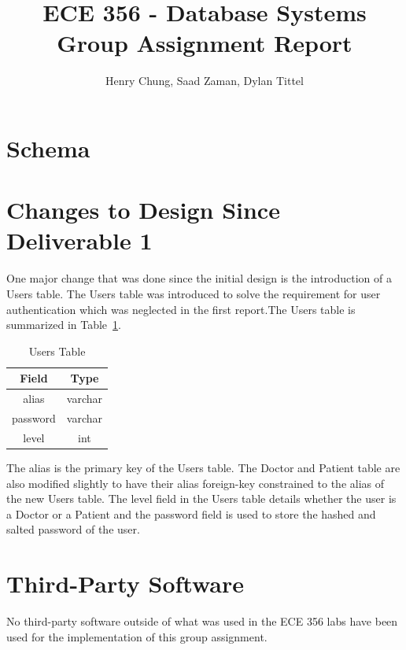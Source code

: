 \documentclass{article}
\begin{document}
\title{ECE 356 - Database Systems Group Assignment Report}
\author{Henry Chung, Saad Zaman, Dylan Tittel}

\maketitle

\tableofcontents
\newpage

\section{Schema}

\section{Changes to Design Since Deliverable 1}
One major change that was done since the initial design is the introduction of a Users table. The Users table was introduced to solve the requirement for user authentication which was neglected in the first report.The Users table is summarized in Table~\ref{tab:usersTable}.
\begin{table}[H]
	\centering
	\caption{Users Table}
	\begin{tabular}{| c | c |}
		\hline
		Field    & Type \\
		\hline
		alias    & varchar \\
		password & varchar \\
		level    & int \\
		\hline
	\end{tabular}
	\label{tab:usersTable}
\end{table}
The alias is the primary key of the Users table. The Doctor and Patient table are also modified slightly to have their alias foreign-key constrained to the alias of the new Users table. The level field in the Users table details whether the user is a Doctor or a Patient and the password field is used to store the hashed and salted password of the user.

\section{Third-Party Software}
No third-party software outside of what was used in the ECE 356 labs have been used for the implementation of this group assignment.
\end{document}
